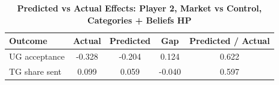 \begin{table}[!htbp]
\centering
\caption{\textbf{Predicted vs Actual Effects: Player 2, Market vs Control, Categories + Beliefs HP}}
\label{tab:cats_hp_market_vs_control_fullpooled_p2_fit}
\begin{tabular}{lcccc}
\toprule
Outcome & Actual & Predicted & Gap & Predicted / Actual \\
\midrule
UG acceptance & -0.328 & -0.204 & 0.124 & 0.622 \\
TG share sent & 0.099 & 0.059 & -0.040 & 0.597 \\
\bottomrule
\end{tabular}
\end{table}
